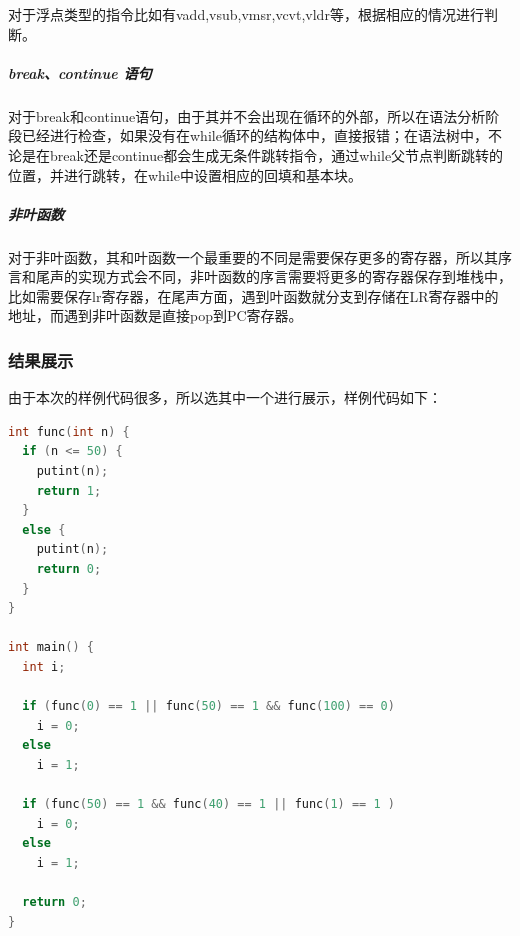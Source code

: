 \documentclass[UTF8,a4paper,10pt]{ctexart}
\begin{document}
对于浮点类型的指令比如有vadd,vsub,vmsr,vcvt,vldr等，根据相应的情况进行判断。

\subparagraph{break、continue 语句}
对于break和continue语句，由于其并不会出现在循环的外部，所以在语法分析阶段已经进行检查，如果没有在while循环的结构体中，直接报错；在语法树中，不论是在break还是continue都会生成无条件跳转指令，通过while父节点判断跳转的位置，并进行跳转，在while中设置相应的回填和基本块。

\subparagraph{非叶函数}

对于非叶函数，其和叶函数一个最重要的不同是需要保存更多的寄存器，所以其序言和尾声的实现方式会不同，非叶函数的序言需要将更多的寄存器保存到堆栈中，比如需要保存lr寄存器，在尾声方面，遇到叶函数就分支到存储在LR寄存器中的地址，而遇到非叶函数是直接pop到PC寄存器。

\subsubsection{结果展示}



由于本次的样例代码很多，所以选其中一个进行展示，样例代码如下：

\begin{lstlisting}[title = 目标代码生成样例代码, language = c++]
int func(int n) {
  if (n <= 50) {
    putint(n);
    return 1;
  }
  else {
    putint(n);
    return 0;
  }
}

int main() {
  int i;

  if (func(0) == 1 || func(50) == 1 && func(100) == 0)
    i = 0;
  else
    i = 1;
  
  if (func(50) == 1 && func(40) == 1 || func(1) == 1 )
    i = 0;
  else
    i = 1;

  return 0;
}
\end{lstlisting}
\end{document}
